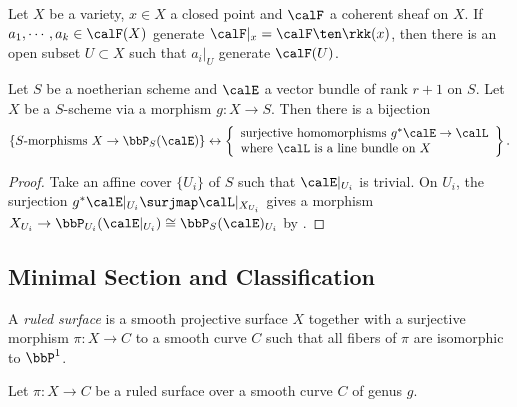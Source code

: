     \begin{proposition}\label{prop: geometric form of Nakayama's lemma}
        Let \(X\) be a variety, $x\in X$ a closed point and $\calF$ a coherent sheaf on $X$.
        If $a_1,\cdots,a_k \in \calF(X)$ generate $\calF|_x = \calF \ten \rkk(x)$, then there is an open subset $U \subset X$ such that $a_i|_U$ generate $\calF(U)$. 
    \end{proposition}

    \begin{proposition}\label{prop:relative_projective_morphism}
        Let \(S\) be a noetherian scheme and \(\calE\) a vector bundle of rank \(r+1\) on \(S\). 
        Let \(X\) be a \(S\)-scheme via a morphism \(g:X \to S\).
        Then there is a bijection
        \[
            \{S\text{-morphisms } X \to \bbP_S(\calE)\}
            \leftrightarrow
            \left\{
                \begin{array}{l}
                    \text{surjective homomorphisms } g^*\calE \to \calL \\
                    \text{where } \calL \text{ is a line bundle on } X
                \end{array}
            \right\}.
        \]
    \end{proposition}
    \begin{proof}
        Take an affine cover \(\{U_i\}\) of \(S\) such that \(\calE|_{U_i}\) is trivial.
        On \(U_i\), the surjection \(g^*\calE|_{U_i} \surjmap \calL|_{X_{U_i}}\) gives a morphism \(X_{U_i} \to \bbP_{U_i}(\calE|_{U_i}) \cong \bbP_{S}(\calE)_{U_i}\) by .

    \end{proof}

\subsection{Minimal Section and Classification}

    \begin{definition}\label{def:ruled_surface}
        A \emph{ruled surface} is a smooth projective surface \(X\) together with a surjective morphism \(\pi:X \to C\) to a smooth curve \(C\) such that all fibers of \(\pi\) are isomorphic to \(\bbP^1\).
    \end{definition}

    Let \(\pi:X \to C\) be a ruled surface over a smooth curve \(C\) of genus \(g\).


